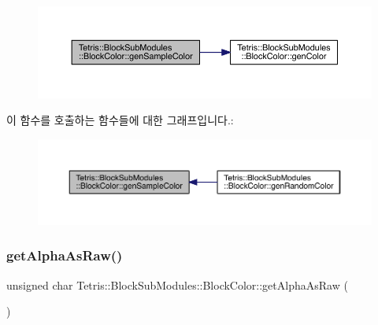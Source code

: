 \nopagebreak
\begin{figure}[H]
\begin{center}
\leavevmode
\includegraphics[width=350pt]{de/d44/class_tetris_1_1_block_sub_modules_1_1_block_color_a624fe688c2889c345cb8dff757f06ef9_cgraph}
\end{center}
\end{figure}
이 함수를 호출하는 함수들에 대한 그래프입니다.\+:
\nopagebreak
\begin{figure}[H]
\begin{center}
\leavevmode
\includegraphics[width=350pt]{de/d44/class_tetris_1_1_block_sub_modules_1_1_block_color_a624fe688c2889c345cb8dff757f06ef9_icgraph}
\end{center}
\end{figure}
\mbox{\label{class_tetris_1_1_block_sub_modules_1_1_block_color_acb1c9b34ee534857741025bd2824201a}} 
\subsubsection{\texorpdfstring{get\+Alpha\+As\+Raw()}{getAlphaAsRaw()}}
{\footnotesize\ttfamily unsigned char Tetris\+::\+Block\+Sub\+Modules\+::\+Block\+Color\+::get\+Alpha\+As\+Raw (\begin{DoxyParamCaption}{ }\end{DoxyParamCaption})\hspace{0.3cm}{\ttfamily [inline]}}

